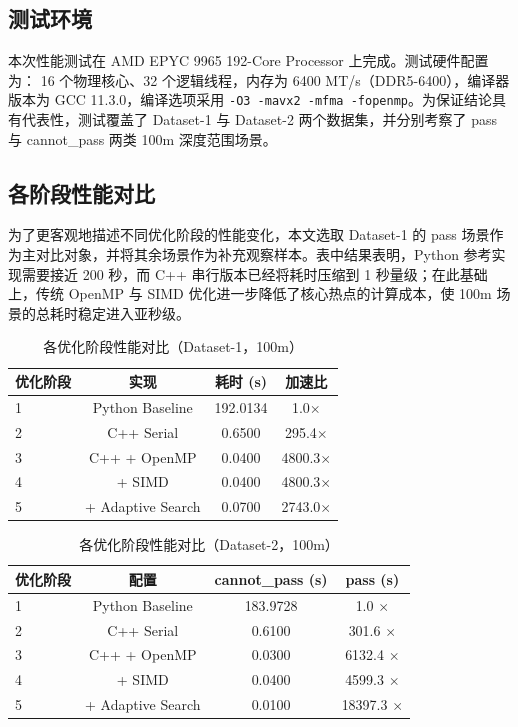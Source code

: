 \documentclass[12pt]{article}
\begin{document}
\subsection{测试环境}

本次性能测试在 AMD EPYC 9965 192-Core Processor 上完成。测试硬件配置为： 16 个物理核心、32 个逻辑线程，内存为 6400 MT/s（DDR5-6400），编译器版本为 GCC 11.3.0，编译选项采用 \texttt{-O3 -mavx2 -mfma -fopenmp}。为保证结论具有代表性，测试覆盖了 Dataset-1 与 Dataset-2 两个数据集，并分别考察了 pass 与 cannot\_pass 两类 100m 深度范围场景。

\subsection{各阶段性能对比}

为了更客观地描述不同优化阶段的性能变化，本文选取 Dataset-1 的 pass 场景作为主对比对象，并将其余场景作为补充观察样本。表中结果表明，Python 参考实现需要接近 200 秒，而 C++ 串行版本已经将耗时压缩到 1 秒量级；在此基础上，传统 OpenMP 与 SIMD 优化进一步降低了核心热点的计算成本，使 100m 场景的总耗时稳定进入亚秒级。

\begin{table}[H]
  \centering
  \caption{各优化阶段性能对比（Dataset-1，100m）}
  \vspace{3mm}
  \begin{tabular}{lccc}
    \toprule
    \textbf{优化阶段} & \textbf{实现} & \textbf{耗时 (s)} & \textbf{加速比} \\
    \midrule
    1 & Python Baseline & 192.0134 & 1.0$\times$ \\
    2 & C++ Serial & 0.6500 & 295.4$\times$ \\
    3 & C++ + OpenMP & 0.0400 & 4800.3$\times$ \\
    4 & + SIMD & 0.0400 & 4800.3$\times$ \\
    5 & + Adaptive Search & 0.0700 & 2743.0$\times$ \\
    \bottomrule
  \end{tabular}
\end{table}

\begin{table}[H]
  \centering
  \caption{各优化阶段性能对比（Dataset-2，100m）}
  \vspace{3mm}
  \begin{tabular}{lccc}
    \toprule
    \textbf{优化阶段} & \textbf{配置} & \textbf{cannot\_pass (s)} & \textbf{pass (s)} \\
    \midrule
    1 & Python Baseline & 183.9728 & 1.0 $\times$ \\
    2 & C++ Serial & 0.6100 & 301.6 $\times$ \\
    3 & C++ + OpenMP & 0.0300 & 6132.4 $\times$ \\
    4 & + SIMD & 0.0400 & 4599.3 $\times$ \\
    5 & + Adaptive Search & 0.0100 & 18397.3 $\times$ \\
    \bottomrule
  \end{tabular}
\end{table}
\end{document}
